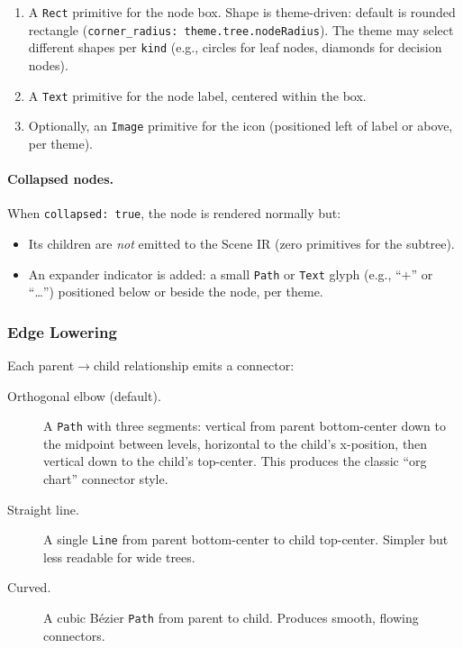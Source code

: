 \begin{enumerate}
  \item A \texttt{Rect} primitive for the node box. Shape is theme-driven: default is rounded rectangle (\texttt{corner\_radius: theme.tree.nodeRadius}). The theme may select different shapes per \texttt{kind} (e.g., circles for leaf nodes, diamonds for decision nodes).
  \item A \texttt{Text} primitive for the node label, centered within the box.
  \item Optionally, an \texttt{Image} primitive for the icon (positioned left of label or above, per theme).
\end{enumerate}

\paragraph{Collapsed nodes.}
When \texttt{collapsed: true}, the node is rendered normally but:
\begin{itemize}
  \item Its children are \emph{not} emitted to the Scene IR (zero primitives for the subtree).
  \item An expander indicator is added: a small \texttt{Path} or \texttt{Text} glyph (e.g., ``$+$'' or ``\ldots'') positioned below or beside the node, per theme.
\end{itemize}

\subsubsection{Edge Lowering}

Each parent$\rightarrow$child relationship emits a connector:

\begin{description}
  \item[Orthogonal elbow (default).] A \texttt{Path} with three segments: vertical from parent bottom-center down to the midpoint between levels, horizontal to the child's x-position, then vertical down to the child's top-center. This produces the classic ``org chart'' connector style.
  
  \item[Straight line.] A single \texttt{Line} from parent bottom-center to child top-center. Simpler but less readable for wide trees.
  
  \item[Curved.] A cubic B\'ezier \texttt{Path} from parent to child. Produces smooth, flowing connectors.
\end{description}

